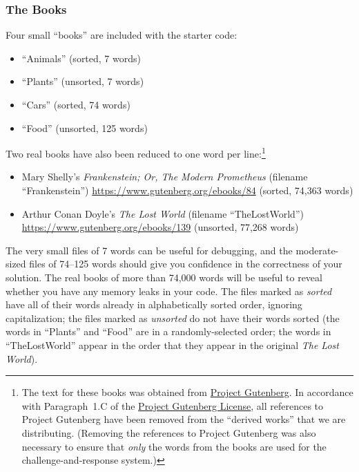 \subsubsection*{The Books}

Four small ``books'' are included with the starter code:

\begin{itemize}
    \item ``Animals'' (sorted, 7 words)
    \item ``Plants'' (unsorted, 7 words)
    \item ``Cars'' (sorted, 74 words)
    \item ``Food'' (unsorted, 125 words)
\end{itemize}

Two real books have also been reduced to one word per line:\footnote{The text for these books was obtained from \href{https://www.gutenberg.org/}{Project Gutenberg}.
In accordance with Paragraph~1.C of the \href{https://www.gutenberg.org/policy/license}{Project Gutenberg License}, all references to Project Gutenberg have been removed from the ``derived works'' that we are distributing.
    (Removing the references to Project Gutenberg was also necessary to ensure that \textit{only} the words from the books are used for the challenge-and-response system.)}

\begin{itemize}
    \item Mary Shelly's \textit{Frankenstein; Or, The Modern Prometheus} (filename ``Frankenstein'') \url{https://www.gutenberg.org/ebooks/84} (sorted, 74,363 words)
    \item Arthur Conan Doyle's \textit{The Lost World} (filename ``TheLostWorld'')
    \url{https://www.gutenberg.org/ebooks/139} (unsorted, 77,268 words)
\end{itemize}

The very small files of 7 words can be useful for debugging, and the moderate-sized files of 74--125 words should give you confidence in the correctness of your solution.
The real books of more than 74,000 words will be useful to reveal whether you have any memory leaks in your code.
The files marked as \textit{sorted} have all of their words already in alphabetically sorted order, ignoring capitalization;
the files marked as \textit{unsorted} do not have their words sorted (the words in ``Plants'' and ``Food'' are in a randomly-selected order;
the words in ``TheLostWorld'' appear in the order that they appear in the original \textit{The Lost World}).

